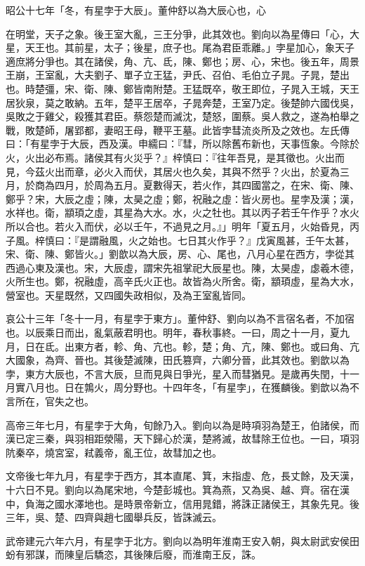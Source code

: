 \begin{pinyinscope}
昭公十七年「冬，有星孛于大辰」。董仲舒以為大辰心也，心

在明堂，天子之象。後王室大亂，三王分爭，此其效也。劉向以為星傳曰「心，大星，天王也。其前星，太子；後星，庶子也。尾為君臣乖離。」孛星加心，象天子適庶將分爭也。其在諸侯，角、亢、氐，陳、鄭也；房、心，宋也。後五年，周景王崩，王室亂，大夫劉子、單子立王猛，尹氏、召伯、毛伯立子晁。子晁，楚出也。時楚彊，宋、衛、陳、鄭皆南附楚。王猛既卒，敬王即位，子晁入王城，天王居狄泉，莫之敢納。五年，楚平王居卒，子晁奔楚，王室乃定。後楚帥六國伐吳，吳敗之于雞父，殺獲其君臣。蔡怨楚而滅沈，楚怒，圍蔡。吳人救之，遂為柏舉之戰，敗楚師，屠郢都，妻昭王母，鞭平王墓。此皆孛彗流炎所及之效也。左氏傳曰：「有星孛于大辰，西及漢。申繻曰：『彗，所以除舊布新也，天事恆象。今除於火，火出必布焉。諸侯其有火災乎？』梓慎曰：『往年吾見，是其徵也。火出而見，今茲火出而章，必火入而伏，其居火也久矣，其與不然乎？火出，於夏為三月，於商為四月，於周為五月。夏數得天，若火作，其四國當之，在宋、衛、陳、鄭乎？宋，大辰之虛；陳，太昊之虛；鄭，祝融之虛：皆火房也。星孛及漢；漢，水祥也。衛，顓頊之虛，其星為大水。水，火之牡也。其以丙子若壬午作乎？水火所以合也。若火入而伏，必以壬午，不過見之月。』」明年「夏五月，火始昏見，丙子風。梓慎曰：『是謂融風，火之始也。七日其火作乎？』戊寅風甚，壬午太甚，宋、衛、陳、鄭皆火。」劉歆以為大辰，房、心、尾也，八月心星在西方，孛從其西過心東及漢也。宋，大辰虛，謂宋先祖掌祀大辰星也。陳，太昊虛，虙羲木德，火所生也。鄭，祝融虛，高辛氏火正也。故皆為火所舍。衛，顓頊虛，星為大水，營室也。天星既然，又四國失政相似，及為王室亂皆同。

哀公十三年「冬十一月，有星孛于東方」。董仲舒、劉向以為不言宿名者，不加宿也。以辰乘日而出，亂氣蔽君明也。明年，春秋事終。一曰，周之十一月，夏九月，日在氐。出東方者，軫、角、亢也。軫，楚；角、亢，陳、鄭也。或曰角、亢大國象，為齊、晉也。其後楚滅陳，田氏篡齊，六卿分晉，此其效也。劉歆以為孛，東方大辰也，不言大辰，旦而見與日爭光，星入而彗猶見。是歲再失閏，十一月實八月也。日在鶉火，周分野也。十四年冬，「有星孛」，在獲麟後。劉歆以為不言所在，官失之也。

高帝三年七月，有星孛于大角，旬餘乃入。劉向以為是時項羽為楚王，伯諸侯，而漢已定三秦，與羽相距滎陽，天下歸心於漢，楚將滅，故彗除王位也。一曰，項羽阬秦卒，燒宮室，弒義帝，亂王位，故彗加之也。

文帝後七年九月，有星孛于西方，其本直尾、箕，末指虛、危，長丈餘，及天漢，十六日不見。劉向以為尾宋地，今楚彭城也。箕為燕，又為吳、越、齊。宿在漢中，負海之國水澤地也。是時景帝新立，信用晁錯，將誅正諸侯王，其象先見。後三年，吳、楚、四齊與趙七國舉兵反，皆誅滅云。

武帝建元六年六月，有星孛于北方。劉向以為明年淮南王安入朝，與太尉武安侯田蚡有邪謀，而陳皇后驕恣，其後陳后廢，而淮南王反，誅。


\end{pinyinscope}
